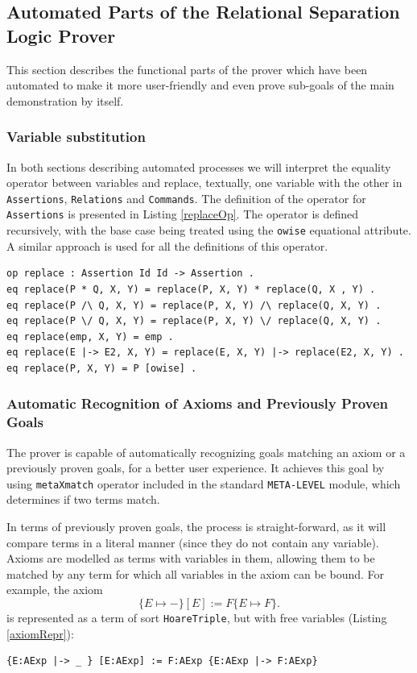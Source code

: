 \documentclass[12pt,a4paper]{article}
\begin{document}
{\subsection{Automated Parts of the Relational Separation Logic Prover}
This section describes the functional parts of the prover which have been automated to make it more user-friendly and even prove sub-goals of the main demonstration by itself.
\subsubsection{Variable substitution}
In both sections describing automated processes we will interpret the equality operator between variables and replace, textually, one variable with the other in \texttt{Assertions}, \texttt{Relations} and \texttt{Commands}. The definition of the operator for \texttt{Assertions} is presented in Listing \ref{replaceOp}. The operator is defined recursively, with the base case being treated using the \texttt{owise} equational attribute. A similar approach is used for all the definitions of this operator. 
\begin{lstlisting}[label=replaceOp,caption=Replace operator definition for assertions]
op replace : Assertion Id Id -> Assertion .
eq replace(P * Q, X, Y) = replace(P, X, Y) * replace(Q, X , Y) .
eq replace(P /\ Q, X, Y) = replace(P, X, Y) /\ replace(Q, X, Y) .
eq replace(P \/ Q, X, Y) = replace(P, X, Y) \/ replace(Q, X, Y) .
eq replace(emp, X, Y) = emp .
eq replace(E |-> E2, X, Y) = replace(E, X, Y) |-> replace(E2, X, Y) .
eq replace(P, X, Y) = P [owise] .
\end{lstlisting}
\subsubsection{Automatic Recognition of Axioms and Previously Proven Goals}
The prover is capable of automatically recognizing goals matching an axiom or a previously proven goals, for a better user experience.
It achieves this goal by using \texttt{metaXmatch} operator included in the standard \texttt{META-LEVEL} module, which determines if two terms match. 

In terms of previously proven goals, the process is straight-forward, as it will compare terms in a literal manner (since they do not contain any variable).
\\

Axioms are modelled as terms with variables in them, allowing them to be matched by any term for which all variables in the axiom can be bound.
	For example, the axiom 
	\[
		\{E \mapsto -\} [E] := F \{E \mapsto F\}.
	\]
	is represented as a term of sort \texttt{HoareTriple}, but with free variables (Listing \ref{axiomRepr}):
	\begin{lstlisting}[caption=Example Axiom,label=axiomRepr]
	{E:AExp |-> _ } [E:AExp] := F:AExp {E:AExp |-> F:AExp}\end{lstlisting}
	
}
\end{document}

